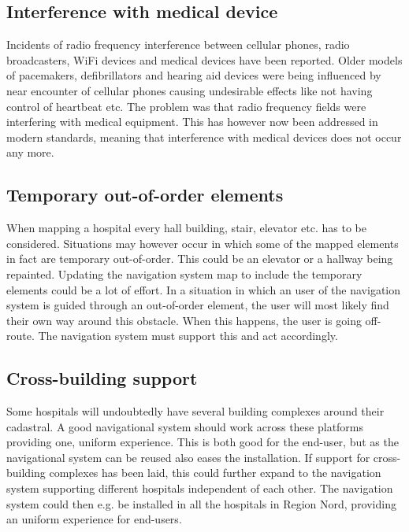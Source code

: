 \subsection{Interference with medical device}

Incidents of radio frequency interference between cellular phones, radio broadcasters, WiFi devices and medical devices have been reported. Older models of pacemakers, defibrillators and hearing aid devices were being influenced by near encounter of cellular phones causing undesirable effects like not having control of heartbeat etc. 
The problem was that radio frequency fields were interfering with medical equipment. This has however now been addressed in modern standards, meaning that interference with medical devices does not occur any more. \cite{Man1998,Case}

\subsection{Temporary out-of-order elements}

When mapping a hospital every hall building, stair, elevator etc. has to be considered. Situations may however occur in which some of the mapped elements in fact are temporary out-of-order. This could be an elevator or a hallway being repainted. Updating the navigation system map to include the temporary elements could be a lot of effort. In a situation in which an user of the navigation system is guided through an out-of-order element, the user will most likely find their own way around this obstacle. When this happens, the user is going off-route. The navigation system must support this and act accordingly.


\subsection{Cross-building support}

Some hospitals will undoubtedly have several building complexes around their cadastral. A good navigational system should work across these platforms providing one, uniform experience. This is both good for the end-user, but as the navigational system can be reused also eases the installation. If support for cross-building complexes has been laid, this could further expand to the navigation system supporting different hospitals independent of each other. The navigation system could then e.g. be installed in all the hospitals in Region Nord, providing an uniform experience for end-users.


